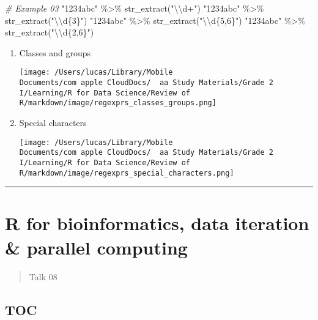 \documentclass[
]{article}
\let\oldincludegraphics\includegraphics
\renewcommand{\includegraphics}[2][]{\begin{center}\oldincludegraphics[#1]{#2}\end{center}}
\newenvironment{Shaded}{}{}
\newcommand{\CommentTok}[1]{\textcolor[rgb]{0.38,0.63,0.69}{\textit{#1}}}
\newcommand{\FunctionTok}[1]{\textcolor[rgb]{0.02,0.16,0.49}{#1}}
\newcommand{\NormalTok}[1]{#1}
\newcommand{\SpecialCharTok}[1]{\textcolor[rgb]{0.25,0.44,0.63}{#1}}
\newcommand{\StringTok}[1]{\textcolor[rgb]{0.25,0.44,0.63}{#1}}
\begin{document}
\begin{Shaded}
\begin{Highlighting}[]
\CommentTok{\# Example 03}
\StringTok{"1234abc"} \SpecialCharTok{\%\textgreater{}\%} \FunctionTok{str\_extract}\NormalTok{(}\StringTok{"}\SpecialCharTok{\textbackslash{}\textbackslash{}}\StringTok{d+"}\NormalTok{)}
\StringTok{"1234abc"} \SpecialCharTok{\%\textgreater{}\%} \FunctionTok{str\_extract}\NormalTok{(}\StringTok{"}\SpecialCharTok{\textbackslash{}\textbackslash{}}\StringTok{d\{3\}"}\NormalTok{)}
\StringTok{"1234abc"} \SpecialCharTok{\%\textgreater{}\%} \FunctionTok{str\_extract}\NormalTok{(}\StringTok{"}\SpecialCharTok{\textbackslash{}\textbackslash{}}\StringTok{d\{5,6\}"}\NormalTok{)}
\StringTok{"1234abc"} \SpecialCharTok{\%\textgreater{}\%} \FunctionTok{str\_extract}\NormalTok{(}\StringTok{"}\SpecialCharTok{\textbackslash{}\textbackslash{}}\StringTok{d\{2,6\}"}\NormalTok{)}
\end{Highlighting}
\end{Shaded}

\begin{enumerate}
\def\labelenumi{\arabic{enumi}.}
\item
  Classes and groups

  \texttt{[image: /Users/lucas/Library/Mobile Documents/com~apple~CloudDocs/~~aa Study Materials/Grade 2 I/Learning/R for Data Science/Review of R/markdown/image/regexprs\_classes\_groups.png]}
\item
  Special characters

  \texttt{[image: /Users/lucas/Library/Mobile Documents/com~apple~CloudDocs/~~aa Study Materials/Grade 2 I/Learning/R for Data Science/Review of R/markdown/image/regexprs\_special\_characters.png]}
\end{enumerate}

\begin{center}\rule{0.5\linewidth}{0.5pt}\end{center}

\hypertarget{r-for-bioinformatics-data-iteration--parallel-computing}{%
\section{R for bioinformatics, data iteration \& parallel
computing}\label{r-for-bioinformatics-data-iteration--parallel-computing}}

\begin{quote}
Talk 08
\end{quote}

\hypertarget{toc-4}{%
\subsection{TOC}\label{toc-4}}
\end{document}
